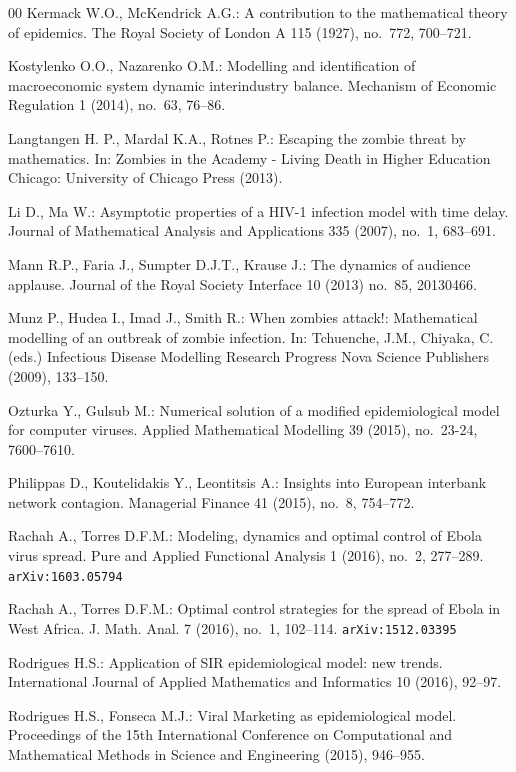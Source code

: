 \documentclass[a4paper,10pt,twoside]{article}
\begin{document}
\begin{thebibliography}{00}
\bibitem{[21]}
Kermack W.O., McKendrick A.G.:
A contribution to the mathematical theory of epidemics.
The Royal Society of London A 115 (1927), no.~772, 700--721.

\bibitem{[20]}
Kostylenko O.O., Nazarenko O.M.:
Modelling and identification of macroeconomic system dynamic interindustry balance.
Mechanism of Economic Regulation 1 (2014), no.~63, 76--86.
    	  		    	
\bibitem{[15]}
Langtangen H. P., Mardal K.A., Rotnes P.:
Escaping the zombie threat by mathematics.
In: Zombies in the Academy - Living Death in Higher Education Chicago:
University of Chicago Press (2013).
	
\bibitem{[2]}
Li D., Ma W.:
Asymptotic properties of a HIV-1 infection model with time delay.
Journal of Mathematical Analysis and Applications 335 (2007), no.~1, 683--691.

\bibitem{[7]}
Mann R.P., Faria J., Sumpter D.J.T., Krause J.:
The dynamics of audience applause.
Journal of the Royal Society Interface 10 (2013) no.~85, 20130466.
		
\bibitem{[14]}
Munz P., Hudea I., Imad J., Smith R.:
When zombies attack!: Mathematical modelling of an outbreak of zombie infection. 
In: Tchuenche, J.M., Chiyaka, C. (eds.)
Infectious Disease Modelling Research Progress Nova Science Publishers (2009), 133--150.

\bibitem{[4]}
Ozturka Y., Gulsub M.:
Numerical solution of a modified epidemiological model for computer viruses.
Applied Mathematical Modelling 39 (2015), no.~23-24, 7600--7610.
		
\bibitem{[24]}
Philippas D., Koutelidakis Y., Leontitsis A.:
Insights into European interbank network contagion.
Managerial Finance 41 (2015), no.~8, 754--772.
    	
\bibitem{[3]}
Rachah A., Torres D.F.M.:
Modeling, dynamics and optimal control of Ebola virus spread.
Pure and Applied Functional Analysis 1 (2016), no.~2, 277--289.
{\tt arXiv:1603.05794}

Rachah A., Torres D.F.M.: 
Optimal control strategies for the spread of Ebola in West Africa. 
J. Math. Anal. 7 (2016), no.~1, 102--114.
{\tt arXiv:1512.03395}

\bibitem{[16]}
Rodrigues H.S.:
Application of SIR epidemiological model: new trends.
International Journal of Applied Mathematics and Informatics 10 (2016), 92--97.    	

\bibitem{[9]}
Rodrigues H.S., Fonseca M.J.:
Viral Marketing as epidemiological model.
Proceedings of the 15th International Conference on Computational 
and Mathematical Methods in Science and Engineering (2015), 946--955.


\end{thebibliography}
\end{document}
